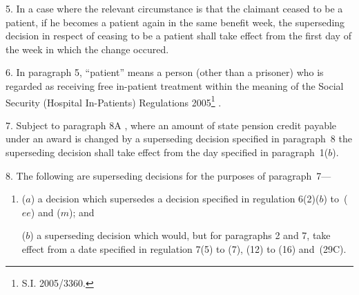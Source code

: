 \documentclass[12pt,a4paper]{article}
\begin{document}
\medskip


5.  In a case where the relevant circumstance is that the claimant ceased to be a patient, if he becomes a patient again in the same benefit week, the superseding decision in respect of ceasing to be a patient shall take effect from the first day of the week in which the change occured.


\medskip

6.  In paragraph 5, “patient” means a person (other than a prisoner) who is regarded as receiving free in-patient treatment within the meaning of the 
Social Security (Hospital In-Patients) Regulations 2005\footnote{S.I. 2005/3360.}%
.


\medskip

7.  
Subject to 
paragraph 8A%
, where  %
an amount of state pension credit payable under an award is changed by a superseding decision specified in paragraph~8 the superseding decision shall take effect from the day specified in paragraph~1($b$).


\medskip

8.  The following are superseding decisions for the purposes of paragraph~7—
\begin{enumerate}\item[]
($a$) a decision which supersedes a decision specified in regulation 6(2)($b$)  to~($ee$)  and ($m$); and

($b$) a superseding decision which would, but for paragraphs 2 and 7, take effect from a date specified in regulation 7(5) to (7), (12) to (16) and~(29C).
\end{enumerate}
\end{document}
